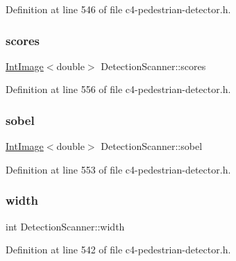 Definition at line 546 of file c4-\/pedestrian-\/detector.\+h.

\mbox{\label{class_detection_scanner_a7358ec22675336179d3cad0809c7b883}} 
\subsubsection{\texorpdfstring{scores}{scores}}
{\footnotesize\ttfamily \mbox{\hyperlink{class_int_image}{Int\+Image}}$<$double$>$ Detection\+Scanner\+::scores\hspace{0.3cm}{\ttfamily [private]}}



Definition at line 556 of file c4-\/pedestrian-\/detector.\+h.

\mbox{\label{class_detection_scanner_a03bc015aac34a51133881b760b929a6b}} 
\subsubsection{\texorpdfstring{sobel}{sobel}}
{\footnotesize\ttfamily \mbox{\hyperlink{class_int_image}{Int\+Image}}$<$double$>$ Detection\+Scanner\+::sobel\hspace{0.3cm}{\ttfamily [private]}}



Definition at line 553 of file c4-\/pedestrian-\/detector.\+h.

\mbox{\label{class_detection_scanner_a37d12c13060640ad0321f089cd565476}} 
\subsubsection{\texorpdfstring{width}{width}}
{\footnotesize\ttfamily int Detection\+Scanner\+::width}



Definition at line 542 of file c4-\/pedestrian-\/detector.\+h.

\mbox{\label{class_detection_scanner_ab7083b6ed15a71fa96d623a8f6500613}} 
